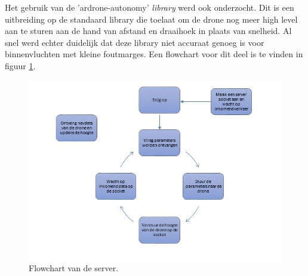 Het gebruik van de 'ardrone-autonomy' \textit{library} werd ook onderzocht.
Dit is een uitbreiding op de standaard library die toelaat om de drone nog meer high level aan te sturen aan de hand van afstand en draaihoek in plaats van snelheid.
Al snel werd echter duidelijk dat deze library niet accuraat genoeg is  voor binnenvluchten met kleine foutmarges.
Een flowchart voor dit deel is te vinden in figuur \ref{fig:flowchart_server}.
\begin{figure}[p]
	\centering
	\includegraphics[width=\textwidth]{images/node_server_flowchart}
	\caption[Flowchart van de server]{Flowchart van de server.}
	\label{fig:flowchart_server}
\end{figure}

